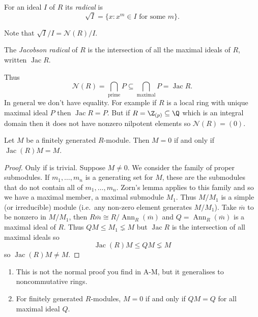 \documentclass[a4paper]{article}
\DeclareMathOperator{\Ann}{Ann} %
\newcommand{\nilrad}[1]{\mathcal{N}({#1})} %
\DeclareMathOperator{\jac}{Jac} %
\begin{document}
\begin{definition}[radical]
  For an ideal \(I\) of \(R\) its \emph{radical} is
  \[
    \sqrt I = \{x: x^m \in I \text{ for some } m\}.
  \]
\end{definition}
Note that \(\sqrt I /I = \nilrad R/I\).

\begin{definition}
  The \emph{Jacobson radical} of \(R\) is the intersection of all the maximal ideals of \(R\), written \(\jac R\).
\end{definition}
Thus
\[
  \nilrad R = \bigcap_{\text{prime}} P \subseteq \bigcap_{\text{maximal}} P = \jac R.
\]
In general we don't have equality. For example if \(R\) is a local ring with unique maximal ideal \(P\) then \(\jac R = P\). But if \(R = \Z_{(p)} \subseteq \Q\) which is an integral domain then it does not have nonzero nilpotent elements so \(\nilrad R = (0)\).

\begin{proposition}
  Let \(M\) be a finitely generated \(R\)-module. Then \(M = 0\) if and only if \(\jac(R) M = M\).
\end{proposition}

\begin{proof}
  Only if is trivial. Suppose \(M \neq 0\). We consider the family of proper submodules. If \(m_1, \dots, m_n\) is a generating set for \(M\), these are the submodules that do not contain all of \(m_1, \dots, m_n\). Zorn's lemma applies to this family and so we have a maximal member, a maximal submodule \(M_1\). Thus \(M/M_1\) is a simple (or irreducible) module (i.e.\ any non-zero element generates \(M/M_1\)). Take \(\overline m\) to be nonzero in \(M/M_1\), then \(R \overline m \cong R/\Ann_R(\overline m)\) and \(Q = \Ann_R(\overline m)\) is a maximal ideal of \(R\). Thus \(QM \leq M_1 \lneq M\) but \(\jac R\) is the intersection of all maximal ideals so
  \[
    \jac(R)M \leq QM \lneq M
  \]
  so \(\jac(R)M \neq M\).
\end{proof}

\begin{remark}\leavevmode
  \begin{enumerate}
  \item This is not the normal proof you find in A-M, but it generalises to noncommutative rings.
  \item For finitely generated \(R\)-modules, \(M = 0\) if and only if \(QM = Q\) for all maximal ideal \(Q\).
  \end{enumerate}
\end{remark}
\end{document}

